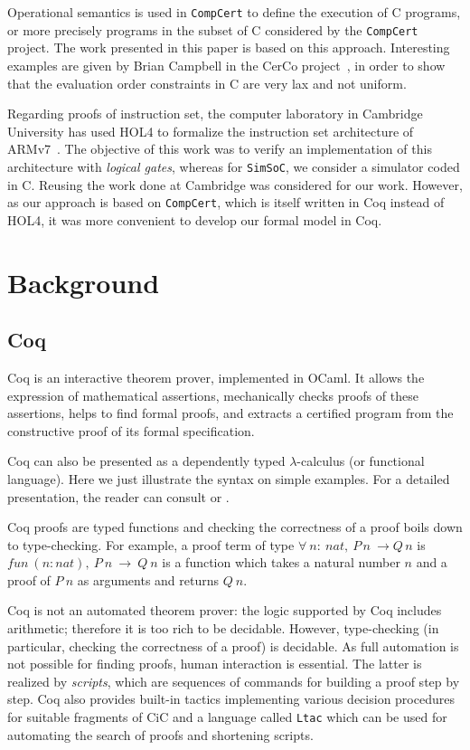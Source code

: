 \documentclass[a4paper, conference]{IEEEtran}
\newcommand{\compcert}{\texttt{CompCert}\xspace}
\newcommand{\simsoc}{\texttt{SimSoC}\xspace}
\newcommand{\compcert}{Compcert\xspace}
\begin{document}
Operational semantics is used in \compcert to define the execution of
C programs, or more precisely programs in the subset of C considered
by the \compcert project.  The work presented in this paper is based
on this approach.  Interesting examples are given by Brian Campbell in
the CerCo project~\cite{campbell2012executable}, in order to show that
the evaluation order constraints in C are very lax and not uniform.

Regarding proofs of instruction set, the computer laboratory in
Cambridge University has used HOL4 to formalize the instruction set
architecture of ARMv7~\cite{FoxM10}.  The objective of this work was
to verify an implementation of this architecture with \emph{logical
  gates}, whereas for \simsoc, we consider a simulator coded in C.
Reusing the work done at Cambridge was considered for our work.
However, as our approach is based on \compcert, which is itself
written in Coq instead of HOL4, it was more convenient to develop our
formal model in Coq.


\section{Background} %
\label{background}

\subsection{Coq}

Coq\cite{coqart} is an interactive theorem prover, implemented in
OCaml. It allows the expression of mathematical assertions,
mechanically checks proofs of these assertions, helps to find formal
proofs, and extracts a certified program from the constructive proof
of its formal specification.

Coq can also be presented as a dependently typed $\lambda$-calculus
(or functional language).
Here we just illustrate the syntax on simple examples.
For a detailed presentation,
the reader can consult \cite{coqmanual} or \cite{coqart}.

Coq proofs are typed functions and checking the correctness of a proof
boils down to type-checking. For example, a proof term of type
$\forall~n:~nat,~P\, n~\rightarrow Q\, n$ is $fun~(n:nat),~P~n~\rightarrow ~Q~n$
is a function which takes a natural number $n$ and a proof of $P~n$ as arguments
and returns $Q~n$.

Coq is not an automated theorem prover: the logic supported by Coq
includes arithmetic; therefore it is too rich to be decidable.
However, type-checking (in particular, checking the correctness of a
proof) is decidable.  As full automation is not possible for finding
proofs, human interaction is essential.  The latter is realized by
\emph{scripts}, which are sequences of commands for building a proof
step by step.  Coq also provides built-in tactics implementing various
decision procedures for suitable fragments of CiC and a language
called \texttt{Ltac} which can be used for automating the search of
proofs and shortening scripts.
\end{document}
